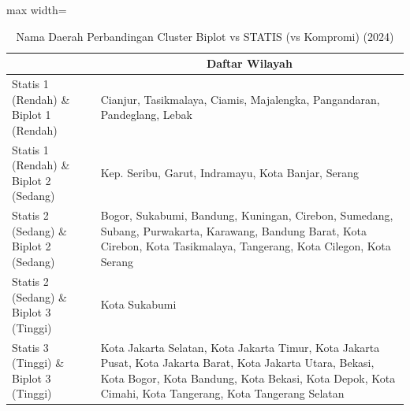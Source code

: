 \begin{table}[H]
\centering
\caption{Nama Daerah Perbandingan Cluster Biplot vs STATIS (vs Kompromi) (2024)} \label{tab:app2biplot_statis_name_2024}
\begin{adjustbox}{max width=\textwidth}
\begin{tabular}{|>{\centering\arraybackslash}p{4cm}|p{10cm}|}
\hline
\multicolumn{1}{|c|}{\textbf{Kategori}} & \multicolumn{1}{c|}{\textbf{Daftar Wilayah}} \\
\hline
Statis 1 (Rendah) \& Biplot 1 (Rendah) & Cianjur, Tasikmalaya, Ciamis, Majalengka, Pangandaran, Pandeglang, Lebak \\
\hline
Statis 1 (Rendah) \& Biplot 2 (Sedang) & Kep. Seribu, Garut, Indramayu, Kota Banjar, Serang \\
\hline
Statis 2 (Sedang) \& Biplot 2 (Sedang) & Bogor, Sukabumi, Bandung, Kuningan, Cirebon, Sumedang, Subang, Purwakarta, Karawang, Bandung Barat, Kota Cirebon, Kota Tasikmalaya, Tangerang, Kota Cilegon, Kota Serang \\
\hline
Statis 2 (Sedang) \& Biplot 3 (Tinggi) & Kota Sukabumi \\
\hline
Statis 3 (Tinggi) \& Biplot 3 (Tinggi) & Kota Jakarta Selatan, Kota Jakarta Timur, Kota Jakarta Pusat, Kota Jakarta Barat, Kota Jakarta Utara, Bekasi, Kota Bogor, Kota Bandung, Kota Bekasi, Kota Depok, Kota Cimahi, Kota Tangerang, Kota Tangerang Selatan \\
\hline
\end{tabular}
\end{adjustbox}
\end{table}